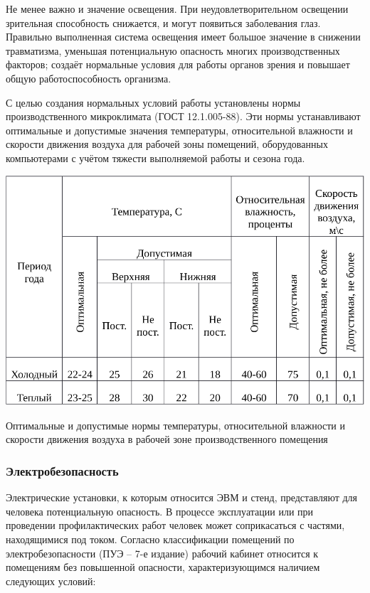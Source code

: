 Не менее важно и значение освещения. При неудовлетворительном освещении зрительная способность снижается, и могут появиться заболевания глаз. Правильно выполненная система освещения имеет большое значение в снижении травматизма, уменьшая потенциальную опасность многих производственных факторов; создаёт нормальные условия для работы органов зрения и повышает общую работоспособность организма.

С целью создания нормальных условий работы установлены нормы производственного микроклимата (ГОСТ 12.1.005-88). Эти нормы устанавливают оптимальные и допустимые значения температуры, относительной влажности и скорости движения воздуха для рабочей зоны помещений, оборудованных компьютерами с учётом тяжести выполняемой работы и сезона года.

\begin{table}[h]
\centering
\includegraphics[width=1\linewidth]{voltage_amper.pdf}
\caption{Оптимальные и допустимые нормы температуры, относительной влажности и скорости движения воздуха в рабочей зоне производственного помещения}
\label{tab:micro_climat}
\end{table}

\subsubsection{Электробезопасность}

Электрические установки, к которым относится ЭВМ и стенд, представляют для человека потенциальную опасность. В процессе эксплуатации или при проведении профилактических работ человек может соприкасаться с частями, находящимися под током. Согласно классификации помещений по электробезопасности (ПУЭ – 7-е издание) рабочий кабинет относится к помещениям без повышенной опасности, характеризующимся наличием следующих условий:

